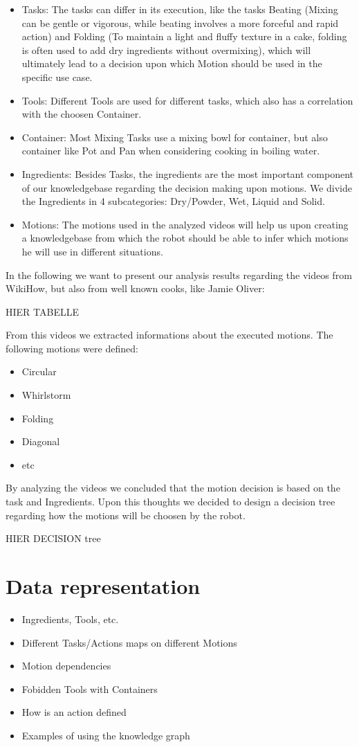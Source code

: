 \documentclass[	pdftex, 
								a4paper,
								11pt, DIV11, BCOR5mm,
								parskip,
								]{scrreprt}
\begin{document}
	\begin{itemize}
		\item Tasks: The tasks can differ in its execution, like the tasks Beating (Mixing can be gentle or vigorous, while beating involves a more forceful and rapid action) and Folding (To maintain a light and fluffy texture in a cake, folding is often used to add dry ingredients without overmixing), which will ultimately lead to a decision upon which Motion should be used in the specific use case.
		\item Tools: Different Tools are used for different tasks, which also has a correlation with the choosen Container.
		\item Container: Most Mixing Tasks use a mixing bowl for container, but also container like Pot and Pan when considering cooking in boiling water.
		\item Ingredients: Besides Tasks, the ingredients are the most important component of our knowledgebase regarding the decision making upon motions. We divide the Ingredients in 4 subcategories: Dry/Powder, Wet, Liquid and Solid.
		\item Motions: The motions used in the analyzed videos will help us upon creating a knowledgebase from which the robot should be able to infer which motions he will use in different situations.
	\end{itemize}

	In the following we want to present our analysis results regarding the videos from WikiHow, but also from well known cooks, like Jamie Oliver:

	HIER TABELLE

	From this videos we extracted informations about the executed motions. The following motions were defined:
	\begin{itemize}
		\item Circular
		\item Whirlstorm
		\item Folding
		\item Diagonal
		\item etc
	\end{itemize}

	By analyzing the videos we concluded that the motion decision is based on the task and Ingredients. Upon this thoughts we decided to design a decision tree regarding how the motions will be choosen by the robot.

	HIER DECISION tree


	\chapter*{Data representation}
	\begin{itemize}
		\item Ingredients, Tools, etc.
		\item Different Tasks/Actions maps on different Motions
		\item Motion dependencies
		\item Fobidden Tools with Containers
		\item How is an action defined
		\item Examples of using the knowledge graph
	\end{itemize}
\end{document}
